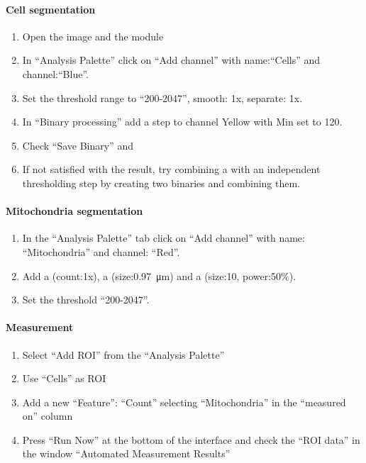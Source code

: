 \paragraph{Cell segmentation}
\begin{enumerate}
    \item Open the image  and the module 
    \item In ``Analysis Palette'' click on ``Add channel'' with name:``Cells'' and channel:``Blue''.
    \item Set the threshold range to ``200-2047'', smooth: 1x, separate: 1x.
    \item In ``Binary processing'' add a step  to channel Yellow with Min set to 120.
    \item Check ``Save Binary'' and 
    \item If not satisfied with the result, try combining a  with an independent thresholding step by creating two binaries and combining them.
\end{enumerate}

\paragraph{Mitochondria segmentation}
\begin{enumerate}
    \item In the ``Analysis Palette'' tab click on ``Add channel'' with name: ``Mitochondria'' and channel: ``Red''.
    \item Add a  (count:1x), a  (size:\SI{0.97}{\micro\meter}) and a  (size:10,  
power:50\%).
    \item Set the threshold ``200-2047''.
\end{enumerate}

\paragraph{Measurement}
\begin{enumerate}
    \item Select ``Add ROI'' from the ``Analysis Palette''
    \item Use ``Cells'' as ROI
    \item Add a new ``Feature'': ``Count'' selecting ``Mitochondria'' in the ``measured on'' column
    \item Press ``Run Now'' at the bottom of the interface and check the ``ROI data'' in the window ``Automated Measurement Results''
\end{enumerate}
